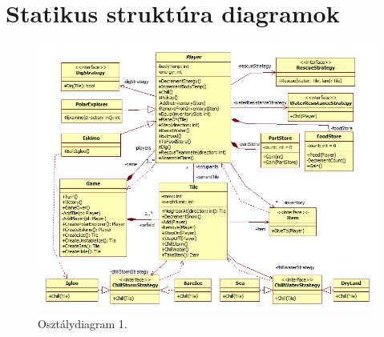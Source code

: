 \section{Statikus struktúra diagramok}

\begin{figure}[H]
	\begin{center}
		\includegraphics[angle=90, scale=0.76]{chapters/chapter04/ClassDiagramPart1.png}
		\caption{Osztálydiagram 1.}
		\label{fig:OsztalyDiagramPart1}
	\end{center}
\end{figure}
